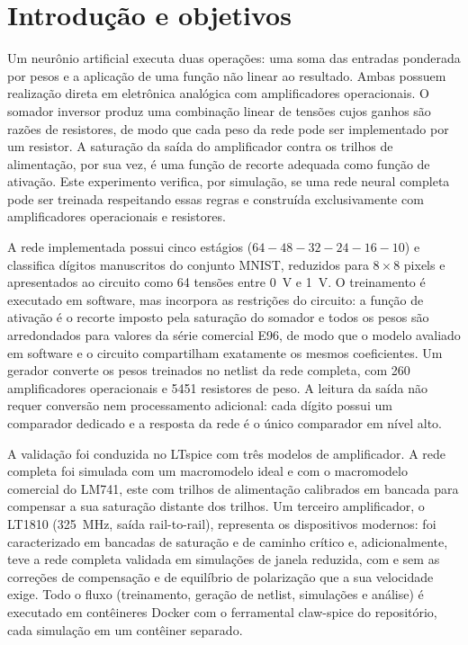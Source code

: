 \section{Introdução e objetivos}
\label{sec:objetivos}

Um neurônio artificial executa duas operações: uma soma das entradas
ponderada por pesos e a aplicação de uma função não linear ao
resultado. Ambas possuem realização direta em eletrônica analógica com
amplificadores operacionais. O somador inversor produz uma combinação
linear de tensões cujos ganhos são razões de resistores, de modo que
cada peso da rede pode ser implementado por um resistor. A saturação
da saída do amplificador contra os trilhos de alimentação, por sua
vez, é uma função de recorte adequada como função de ativação. Este
experimento verifica, por simulação, se uma rede neural completa pode
ser treinada respeitando essas regras e construída exclusivamente com
amplificadores operacionais e resistores.

A rede implementada possui cinco estágios
($64\!-\!48\!-\!32\!-\!24\!-\!16\!-\!10$) e classifica dígitos
manuscritos do conjunto MNIST, reduzidos para $8\times 8$ pixels e
apresentados ao circuito como 64 tensões entre \SI{0}{\volt} e
\SI{1}{\volt}. O treinamento é executado em software, mas incorpora as
restrições do circuito: a função de ativação é o recorte imposto pela
saturação do somador e todos os pesos são arredondados para valores da
série comercial E96, de modo que o modelo avaliado em software e o
circuito compartilham exatamente os mesmos coeficientes. Um gerador
converte os pesos treinados no netlist da rede completa, com 260
amplificadores operacionais e \num{5451} resistores de peso. A leitura
da saída não requer conversão nem processamento adicional: cada dígito
possui um comparador dedicado e a resposta da rede é o único
comparador em nível alto.

A validação foi conduzida no LTspice com três modelos de amplificador.
A rede completa foi simulada com um macromodelo ideal e com o
macromodelo comercial do LM741, este com trilhos de alimentação
calibrados em bancada para compensar a sua saturação distante dos
trilhos. Um terceiro amplificador, o LT1810 (\SI{325}{\mega\hertz},
saída rail-to-rail), representa os dispositivos modernos: foi
caracterizado em bancadas de saturação e de caminho crítico e,
adicionalmente, teve a rede completa validada em simulações de janela
reduzida, com e sem as correções de compensação e de equilíbrio de
polarização que a sua velocidade exige. Todo o fluxo (treinamento,
geração de netlist, simulações e análise) é executado em contêineres
Docker com o ferramental claw-spice do repositório, cada simulação em
um contêiner separado.

